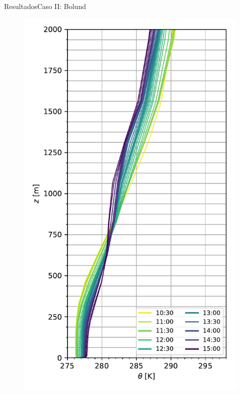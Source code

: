 \documentclass[mathserif,10pt]{beamer}
\begin{document}
\begin{frame}{Resultados}{Caso II: Bolund}
	\begin{figure}[H]
		\begin{minipage}{0.5\linewidth}
			\centering
			\includegraphics[width=0.75\linewidth,trim={0cm 5mm 0cm 0mm},clip]{fig/06/bol/mean_pbl}%
		\end{minipage}%
		\begin{minipage}{0.5\linewidth}
			\centering

\end{minipage}
\end{figure}
\end{frame}
\end{document}

